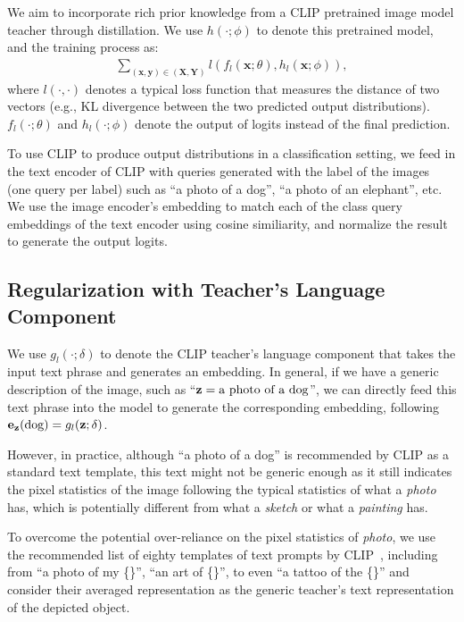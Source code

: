 \documentclass[10pt,twocolumn,letterpaper]{article}
\newcommand{\X}{\mathbf{X}}
\newcommand{\Y}{\mathbf{Y}}
\newcommand{\x}{\mathbf{x}}
\newcommand{\y}{\mathbf{y}}
\newcommand{\z}{\mathbf{z}}
\begin{document}
We aim to incorporate rich prior knowledge from a CLIP pretrained image model teacher
through distillation. 
We use $h(\cdot;\phi)$ to denote this pretrained model, 
and the training process as:
\begin{align}
\sum_{(\x,\y)\in(\X,\Y)} l(f_l(\x;\theta), h_l(\x;\phi)), 
    \label{eq:distill}
\end{align}
where $l(\cdot,\cdot)$ denotes a typical loss function that measures the distance of two vectors (e.g., KL divergence between the two predicted output distributions). 
$f_l(\cdot;\theta)$ and $h_l(\cdot;\phi)$ denote the output of logits instead of the final prediction. 



To use CLIP to produce output distributions in a classification setting, 
we feed in the text encoder of CLIP with queries 
generated with the label of the images (one query per label) 
such as 
``a photo of a dog'', ``a photo of an elephant'', etc. 
We use the image encoder's embedding to match each of the class query embeddings of the text encoder using cosine similiarity, and normalize the result to generate the output logits. 














\subsection{Regularization with Teacher's Language Component}

We use $g_l(\cdot;\delta)$ to denote the CLIP teacher's language component
that takes the input text phrase 
and generates an embedding. 
In general, if we have a generic description 
of the image, such as ``$\z=\textnormal{a photo of a dog}$'', 
we can directly feed this text phrase into the model to generate 
the corresponding
embedding, 
following $\mathbf{e_\z}(\textnormal{dog}) = g_l(\z;\delta)$. 

However, in practice, 
although ``a photo of a dog'' 
is recommended by CLIP as a standard text template, 
this text 
might not be generic enough as it still
indicates the pixel statistics of the image 
following the typical statistics of what a \emph{photo} has, which is 
potentially different from what a \emph{sketch} or what a \emph{painting} has. 

To overcome the potential over-reliance on the pixel statistics 
of \emph{photo}, we use the recommended list of eighty templates 
of text prompts by CLIP~\cite{radford2021learning}, including from ``a photo of my \{\}'', 
``an art of \{\}'', to even ``a tattoo of the \{\}''
and consider their averaged representation as 
the generic teacher's text representation 
of the depicted object. 
\end{document}
